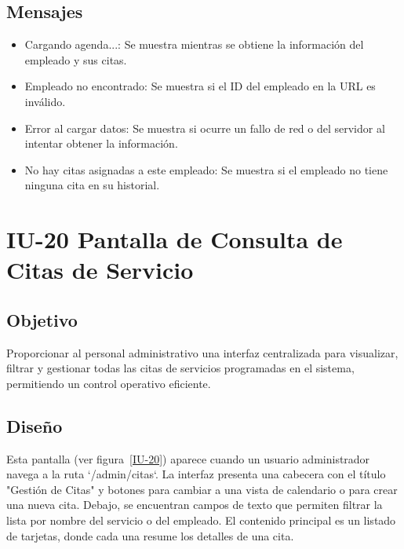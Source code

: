 \subsection{Mensajes}
\begin{itemize}
    \item Cargando agenda...: Se muestra mientras se obtiene la información del empleado y sus citas.
    \item Empleado no encontrado: Se muestra si el ID del empleado en la URL es inválido.
    \item Error al cargar datos: Se muestra si ocurre un fallo de red o del servidor al intentar obtener la información.
    \item No hay citas asignadas a este empleado: Se muestra si el empleado no tiene ninguna cita en su historial.
\end{itemize}

\section{IU-20 Pantalla de Consulta de Citas de Servicio}

\subsection{Objetivo}
    Proporcionar al personal administrativo una interfaz centralizada para visualizar, filtrar y gestionar todas las citas de servicios programadas en el sistema, permitiendo un control operativo eficiente.

\subsection{Diseño}
    Esta pantalla  (ver figura~\ref{IU-20}) aparece cuando un usuario administrador navega a la ruta `/admin/citas`. La interfaz presenta una cabecera con el título "Gestión de Citas" y botones para cambiar a una vista de calendario o para crear una nueva cita. Debajo, se encuentran campos de texto que permiten filtrar la lista por nombre del servicio o del empleado. El contenido principal es un listado de tarjetas, donde cada una resume los detalles de una cita.


